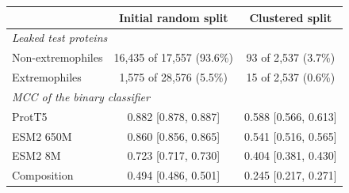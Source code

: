 \begin{tabular}{lcc}
\hline
 & \textbf{Initial random split} & \textbf{Clustered split} \\
\hline
\multicolumn{3}{l}{\textit{Leaked test proteins}} \\
Non-extremophiles & 16{,}435 of 17{,}557 (93.6\%) & 93 of 2{,}537 (3.7\%) \\
Extremophiles & 1{,}575 of 28{,}576 (5.5\%) & 15 of 2{,}537 (0.6\%) \\
\hline
\multicolumn{3}{l}{\textit{MCC of the binary classifier}} \\
ProtT5 & 0.882 {\scriptsize[0.878, 0.887]} & 0.588 {\scriptsize[0.566, 0.613]} \\
ESM2 650M & 0.860 {\scriptsize[0.856, 0.865]} & 0.541 {\scriptsize[0.516, 0.565]} \\
ESM2 8M & 0.723 {\scriptsize[0.717, 0.730]} & 0.404 {\scriptsize[0.381, 0.430]} \\
Composition & 0.494 {\scriptsize[0.486, 0.501]} & 0.245 {\scriptsize[0.217, 0.271]} \\
\hline
\end{tabular}
